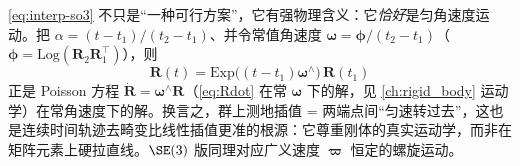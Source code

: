 \begin{insight}[测地插值 = 匀速运动：与 Poisson 方程的精确联系]
\cref{eq:interp-so3} 不只是“一种可行方案”，它有强物理含义：它\emph{恰好}是匀角速度运动。把 $\alpha=(t-t_1)/(t_2-t_1)$、并令常值角速度 $\boldsymbol{\omega}=\boldsymbol{\phi}/(t_2-t_1)$（$\boldsymbol{\phi}=\mathrm{Log}(\mathbf{R}_2\mathbf{R}_1^\top)$），则
\[
  \mathbf{R}(t)=\mathrm{Exp}\big((t-t_1)\boldsymbol{\omega}^\wedge\big)\,\mathbf{R}(t_1)
\]
正是 Poisson 方程 $\dot{\mathbf{R}}=\boldsymbol{\omega}^\wedge\mathbf{R}$（\cref{eq:Rdot} 在常 $\boldsymbol{\omega}$ 下的解，见 \cref{ch:rigid_body} 运动学）在常角速度下的解。换言之，群上测地插值 = 两端点间“匀速转过去”，这也是连续时间轨迹去畸变比线性插值更准的根源：它尊重刚体的真实运动学，而非在矩阵元素上硬拉直线。$\SE(3)$ 版同理对应广义速度 $\boldsymbol{\varpi}$ 恒定的螺旋运动。
\end{insight}

